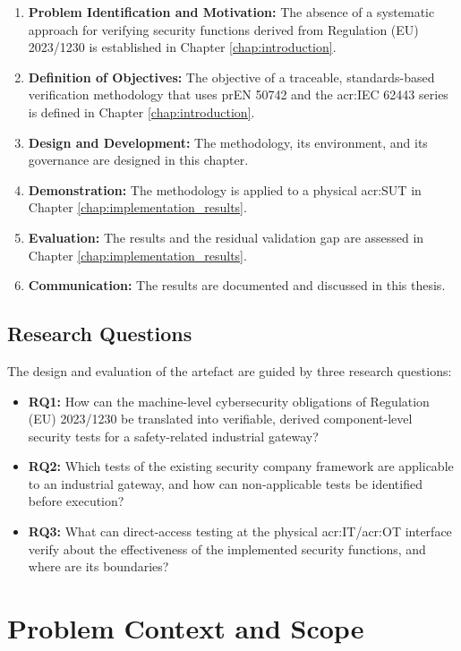 \begin{enumerate} 
	\item \textbf{Problem Identification and Motivation:} The absence of a systematic approach for verifying security functions derived from Regulation (EU) 2023/1230 is established in Chapter \ref{chap:introduction}. 
	\item \textbf{Definition of Objectives:} The objective of a traceable, standards-based verification methodology that uses prEN 50742 and the \gls{acr:IEC} 62443 series is defined in Chapter \ref{chap:introduction}. 
	\item \textbf{Design and Development:} The methodology, its environment, and its governance are designed in this chapter. 
	\item \textbf{Demonstration:} The methodology is applied to a physical \gls{acr:SUT} in Chapter \ref{chap:implementation_results}. 
	\item \textbf{Evaluation:} The results and the residual validation gap are assessed in Chapter \ref{chap:implementation_results}. 
	\item \textbf{Communication:} The results are documented and discussed in this thesis. 
\end{enumerate} 

\subsection{Research Questions} 
\label{subsec:research_questions}

The design and evaluation of the artefact are guided by three research questions:
\begin{itemize} 
	\item \textbf{RQ1:} How can the machine-level cybersecurity obligations of Regulation (EU) 2023/1230 be translated into verifiable, derived component-level security tests for a safety-related industrial gateway?
	\item \textbf{RQ2:} Which tests of the existing security company framework are applicable to an industrial gateway, and how can non-applicable tests be identified before execution?
	\item \textbf{RQ3:} What can direct-access testing at the physical \gls{acr:IT}/\gls{acr:OT} interface verify about the effectiveness of the implemented security functions, and where are its boundaries?
\end{itemize}

\section{Problem Context and Scope} 
\label{sec:problem_context} 

